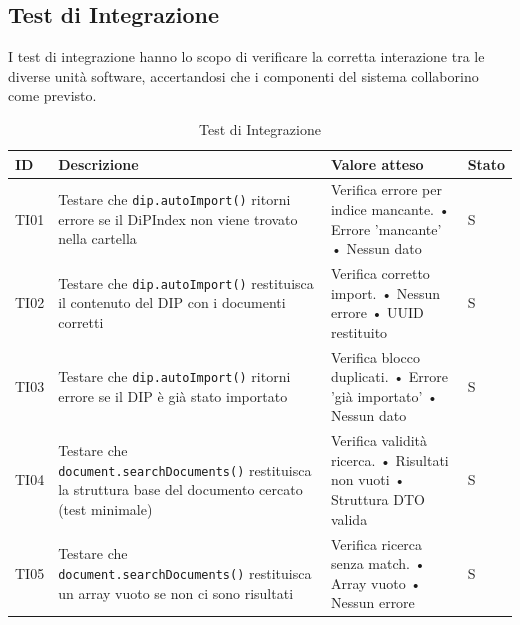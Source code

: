 \documentclass[a4paper,12pt]{article}
\begin{document}
        \subsection{Test di Integrazione}

        I test di integrazione hanno lo scopo di verificare la corretta interazione tra le diverse unità software, accertandosi che i componenti del sistema collaborino come previsto.

        \begin{longtable}{|M{1.2cm}|M{6.3cm}|M{5cm}|M{1.5cm}|}
                
            \caption{Test di Integrazione} \\
            \hline
            \textbf{ID} & \textbf{Descrizione} & \textbf{Valore atteso} & \textbf{Stato} \\
            \hline
            \endhead

            TI01 & Testare che \texttt{dip.autoImport()} ritorni errore se il DiPIndex non viene trovato nella cartella & Verifica errore per indice mancante. \newline • Errore 'mancante' \newline • Nessun dato & S \\ \hline

            TI02 & Testare che \texttt{dip.autoImport()} restituisca il contenuto del DIP con i documenti corretti & Verifica corretto import. \newline • Nessun errore \newline • UUID restituito & S \\ \hline
            
            TI03 & Testare che \texttt{dip.autoImport()} ritorni errore se il DIP è già stato importato & Verifica blocco duplicati. \newline • Errore 'già importato' \newline • Nessun dato & S \\ \hline
            
            TI04 & Testare che \texttt{document.searchDocuments()} restituisca la struttura base del documento cercato (test minimale) & Verifica validità ricerca. \newline • Risultati non vuoti \newline • Struttura DTO valida & S \\ \hline
            
            TI05 & Testare che \texttt{document.searchDocuments()} restituisca un array vuoto se non ci sono risultati & Verifica ricerca senza match. \newline • Array vuoto \newline • Nessun errore & S \\ \hline
            

\end{longtable}
\end{document}
